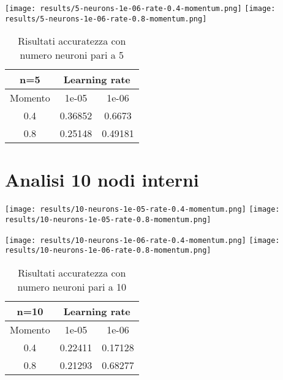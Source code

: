 \begin{center}
\texttt{[image: results/5-neurons-1e-06-rate-0.4-momentum.png]}
\texttt{[image: results/5-neurons-1e-06-rate-0.8-momentum.png]}
\end{center}
\begin{table}[htbp]
    \centering
    \begin{tabular}{|c|c|c|}
    \hline
    n=5 & \multicolumn{2}{c|}{Learning rate} \\
    \hline
    Momento & 1e-05 & 1e-06 \\
    \hline
    0.4 & 0.36852 & 0.6673 \\
    \hline
    0.8 & 0.25148 & 0.49181 \\
    \hline
    \end{tabular}
    \caption{Risultati accuratezza con numero neuroni pari a 5}
\end{table}

\section{Analisi 10 nodi interni}
\begin{center}
\texttt{[image: results/10-neurons-1e-05-rate-0.4-momentum.png]}
\texttt{[image: results/10-neurons-1e-05-rate-0.8-momentum.png]}
\end{center}

\begin{center}
\texttt{[image: results/10-neurons-1e-06-rate-0.4-momentum.png]}
\texttt{[image: results/10-neurons-1e-06-rate-0.8-momentum.png]}
\end{center}
\begin{table}[htbp]
    \centering
    \begin{tabular}{|c|c|c|}
    \hline
    n=10 & \multicolumn{2}{c|}{Learning rate} \\
    \hline
    Momento & 1e-05 & 1e-06 \\
    \hline
    0.4 & 0.22411 & 0.17128 \\
    \hline
    0.8 & 0.21293 & 0.68277 \\
    \hline
    \end{tabular}
    \caption{Risultati accuratezza con numero neuroni pari a 10}
\end{table}

